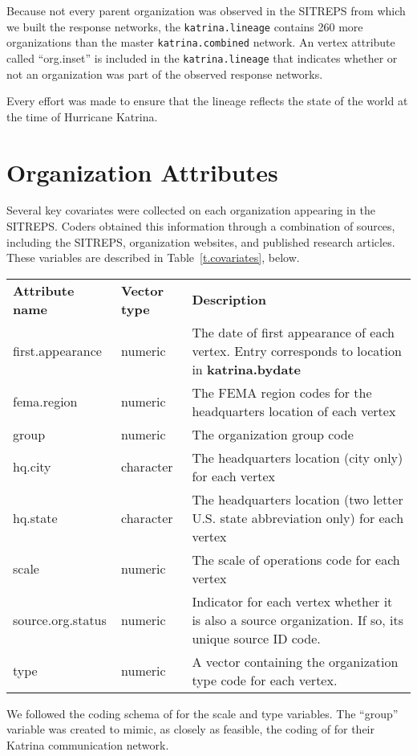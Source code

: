 \documentclass[11pt]{article}
\begin{document}
Because not every parent organization was observed in the SITREPS from which we built the response networks, the \texttt{katrina.lineage} contains 260 more organizations than the master \texttt{katrina.combined} network. An vertex attribute called ``org.inset'' is included in the \texttt{katrina.lineage} that indicates whether or not an organization was part of the observed response networks.

Every effort was made to ensure that the lineage reflects the state of the world at the time of Hurricane Katrina.

\section{Organization Attributes}
Several key covariates were collected on each organization appearing in the SITREPS. Coders obtained this information through a combination of sources, including the SITREPS, organization websites, and published research articles. These variables are described in Table~\ref{t.covariates}, below.
\begin{sidewaystable}
	\begin{tabular}{lll}
		\textbf{Attribute name} & \textbf{Vector type} & \textbf{Description} \\
                first.appearance & numeric & The date of first appearance of each vertex.  Entry corresponds to location in \textbf{katrina.bydate}\\
		fema.region & numeric & The FEMA region codes for the headquarters location of each vertex\\
		group & numeric & The organization group code \\
		hq.city & character & The headquarters location (city only) for each vertex\\
		hq.state & character & The headquarters location (two letter U.S. state abbreviation only) for each vertex\\
		scale & numeric & The scale of operations code for each vertex\\
		source.org.status & numeric & Indicator for each vertex whether it is also a source organization.  If so, its unique source ID code.\\
		type & numeric & A vector containing the organization type code for each vertex.\\
                \hline
	\end{tabular}
\caption{\label{t.covariates}Table of Organization Covariates}
\end{sidewaystable}

We followed the coding schema of \citet{tierney2002llrg} for the scale and type variables. The ``group'' variable was created to mimic, as closely as feasible, the coding of \citet{lind&2008brdr} for their Katrina communication network.

\clearpage

\end{document}
